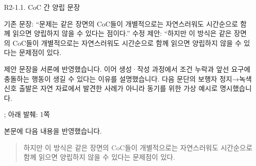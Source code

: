 




\clearpage

\begin{reviewitem}{R2-1.1. CoC 간 양립 문장}

\begin{reviewercomment}

기존 문장: ``문제는 같은 장면의 CoC들이 개별적으로는 자연스러워도 시간순으로 함께 읽으면 양립하지 않을 수 있다는 점이다.'' 수정 제안: ``하지만 이 방식은 같은 장면의 CoC들이 개별적으로는 자연스러워도 시간순으로 함께 읽으면 양립하지 않을 수 있다는 문제점이 있다.

\end{reviewercomment}

\begin{authorresponse}

제안 문장을 서론에 반영했습니다. 이어 생성·작성 과정에서 조건 누락과 앞선 요구에 충돌하는 행동이 생길 수 있다는 이유를 설명했습니다. 다음 문단의 보행자 정지→녹색 신호 출발은 자연 자료에서 발견한 사례가 아니라 동기를 위한 가상 예시로 명시했습니다.

\end{authorresponse}

\begin{manuscriptrevision}{; 아래 발췌: 1쪽}

본문에 다음 내용을 반영했습니다.

\begin{quote}

하지만 이 방식은 같은 장면의 CoC들이 개별적으로는 자연스러워도 시간순으로 함께 읽으면 양립하지 않을 수 있다는 문제점이 있다.

\end{quote}

\end{manuscriptrevision}

\end{reviewitem}

\clearpage

